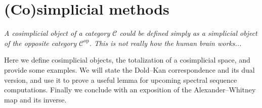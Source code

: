 \section{(Co)simplicial methods}\label{chapter:cosimplicial}
\epigraph{\textit{A cosimplicial object of a category $\mathcal{C}$ could be defined simply as a simplicial object of the opposite category $\mathcal{C}^\mathrm{op}$. This is not really how the human brain works...}}{\cite[\href{https://stacks.math.columbia.edu/tag/016I}{Tag 016I}]{stacks-project}}

\noindent Here we define cosimplicial objects, the totalization of a cosimplicial space, and provide some examples. We will state the Dold--Kan correspondence and its dual version, and use it to prove a useful lemma for upcoming spectral sequence computations. Finally we conclude with an exposition of the Alexander--Whitney map and its inverse.

